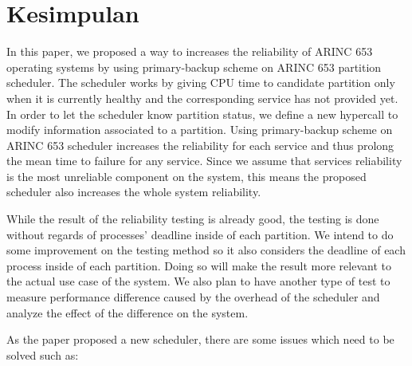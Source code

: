 \chapter{Kesimpulan}

In this paper, we proposed a way to increases the reliability of ARINC 653 operating systems by
using primary-backup scheme on ARINC 653 partition scheduler. The scheduler works by giving CPU
time to candidate partition only when it is currently healthy and the corresponding service has
not provided yet. In order to let the scheduler know partition status, we define a new hypercall
to modify information associated to a partition. Using primary-backup scheme on ARINC 653
scheduler increases the reliability for each service and thus prolong the mean time to failure
for any service. Since we assume that services reliability is the most unreliable component on the
system, this means the proposed scheduler also increases the whole system reliability.

While the result of the reliability testing is already good, the testing is done without regards
of processes' deadline inside of each partition. We intend to do some improvement on the testing
method so it also considers the deadline of each process inside of each partition. Doing so will
make the result more relevant to the actual use case of the system. We also plan to have
another type of test to measure performance difference caused by the overhead of the scheduler
and analyze the effect of the difference on the system.

As the paper proposed a new scheduler, there are some issues which need to be solved such as:

